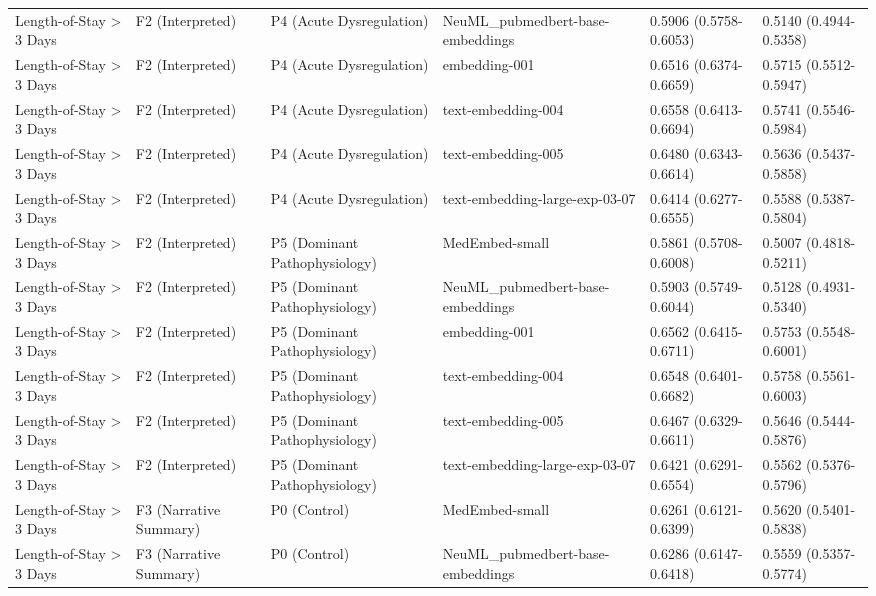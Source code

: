 \documentclass[border=0pt]{standalone}
\begin{document}
\begin{adjustbox}{width=\textwidth}
\begin{tabular}{llllll}
Length-of-Stay \textgreater{} 3 Days & F2 (Interpreted) & P4 (Acute Dysregulation) & NeuML\_pubmedbert-base-embeddings & 0.5906 (0.5758-0.6053) & 0.5140 (0.4944-0.5358) \\
Length-of-Stay \textgreater{} 3 Days & F2 (Interpreted) & P4 (Acute Dysregulation) & embedding-001 & 0.6516 (0.6374-0.6659) & 0.5715 (0.5512-0.5947) \\
Length-of-Stay \textgreater{} 3 Days & F2 (Interpreted) & P4 (Acute Dysregulation) & text-embedding-004 & 0.6558 (0.6413-0.6694) & 0.5741 (0.5546-0.5984) \\
Length-of-Stay \textgreater{} 3 Days & F2 (Interpreted) & P4 (Acute Dysregulation) & text-embedding-005 & 0.6480 (0.6343-0.6614) & 0.5636 (0.5437-0.5858) \\
Length-of-Stay \textgreater{} 3 Days & F2 (Interpreted) & P4 (Acute Dysregulation) & text-embedding-large-exp-03-07 & 0.6414 (0.6277-0.6555) & 0.5588 (0.5387-0.5804) \\
Length-of-Stay \textgreater{} 3 Days & F2 (Interpreted) & P5 (Dominant Pathophysiology) & MedEmbed-small & 0.5861 (0.5708-0.6008) & 0.5007 (0.4818-0.5211) \\
Length-of-Stay \textgreater{} 3 Days & F2 (Interpreted) & P5 (Dominant Pathophysiology) & NeuML\_pubmedbert-base-embeddings & 0.5903 (0.5749-0.6044) & 0.5128 (0.4931-0.5340) \\
Length-of-Stay \textgreater{} 3 Days & F2 (Interpreted) & P5 (Dominant Pathophysiology) & embedding-001 & 0.6562 (0.6415-0.6711) & 0.5753 (0.5548-0.6001) \\
Length-of-Stay \textgreater{} 3 Days & F2 (Interpreted) & P5 (Dominant Pathophysiology) & text-embedding-004 & 0.6548 (0.6401-0.6682) & 0.5758 (0.5561-0.6003) \\
Length-of-Stay \textgreater{} 3 Days & F2 (Interpreted) & P5 (Dominant Pathophysiology) & text-embedding-005 & 0.6467 (0.6329-0.6611) & 0.5646 (0.5444-0.5876) \\
Length-of-Stay \textgreater{} 3 Days & F2 (Interpreted) & P5 (Dominant Pathophysiology) & text-embedding-large-exp-03-07 & 0.6421 (0.6291-0.6554) & 0.5562 (0.5376-0.5796) \\
Length-of-Stay \textgreater{} 3 Days & F3 (Narrative Summary) & P0 (Control) & MedEmbed-small & 0.6261 (0.6121-0.6399) & 0.5620 (0.5401-0.5838) \\
Length-of-Stay \textgreater{} 3 Days & F3 (Narrative Summary) & P0 (Control) & NeuML\_pubmedbert-base-embeddings & 0.6286 (0.6147-0.6418) & 0.5559 (0.5357-0.5774) \\

\end{tabular}
\end{adjustbox}
\end{document}
